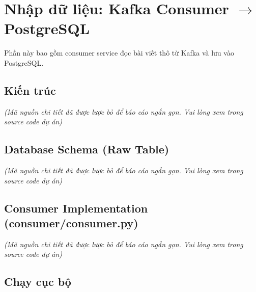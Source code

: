 \hypertarget{nhux1eadp-dux1eef-liux1ec7u-kafka-consumer-rightarrow-postgresql}{%
\section{\texorpdfstring{Nhập dữ liệu: Kafka Consumer \(\rightarrow\)
PostgreSQL}{Nhập dữ liệu: Kafka Consumer \textbackslash rightarrow PostgreSQL}}}

Phần này bao gồm consumer service đọc bài viết thô từ Kafka và lưu vào
PostgreSQL.

\hypertarget{kiux1ebfn-truxfac}{%
\subsection{Kiến trúc}}

\emph{(Mã nguồn chi tiết đã được lược bỏ để báo cáo ngắn gọn. Vui lòng
xem trong source code dự án)}

\hypertarget{database-schema-raw-table}{%
\subsection{Database Schema (Raw
Table)}}

\emph{(Mã nguồn chi tiết đã được lược bỏ để báo cáo ngắn gọn. Vui lòng
xem trong source code dự án)}

\hypertarget{consumer-implementation-consumerconsumer.py}{%
\subsection{Consumer Implementation
(consumer/consumer.py)}}

\emph{(Mã nguồn chi tiết đã được lược bỏ để báo cáo ngắn gọn. Vui lòng
xem trong source code dự án)}

\hypertarget{chux1ea1y-cux1ee5c-bux1ed9}{%
\subsection{Chạy cục bộ}}

\begin{Shaded}
\begin{Highlighting}[]


\end{Highlighting}
\end{Shaded}

